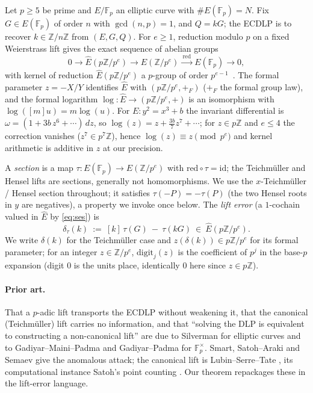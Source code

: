 \documentclass[11pt]{article}
\theoremstyle{definition}
\newcommand{\Fp}{\mathbb{F}_p}
\newcommand{\Z}{\mathbb{Z}}
\newcommand{\Ehat}{\widehat{E}}
\newcommand{\red}{\mathrm{red}}
\begin{document}
Let $p\ge 5$ be prime and $E/\Fp$ an elliptic curve with $\#E(\Fp)=N$.
Fix $G\in E(\Fp)$ of order $n$ with $\gcd(n,p)=1$, and $Q=kG$; the ECDLP
is to recover $k\in\Z/n\Z$ from $(E,G,Q)$. For $e\ge 1$, reduction modulo
$p$ on a fixed Weierstrass lift gives the exact sequence of abelian
groups
\begin{equation}\label{eq:ses}
0 \longrightarrow \Ehat(p\Z/p^e) \longrightarrow E(\Z/p^e)
  \xrightarrow{\ \red\ } E(\Fp) \longrightarrow 0,
\end{equation}
with kernel of reduction $\Ehat(p\Z/p^e)$ a $p$-group of order $p^{e-1}$~\cite{silvermanaec}.
The formal parameter $z=-X/Y$ identifies $\Ehat$ with $(p\Z/p^e,+_F)$
($+_F$ the formal group law), and the formal logarithm
$\log\colon\Ehat\to(p\Z/p^e,+)$ is an isomorphism with
$\log([m]u)=m\log(u)$. For $E\colon y^2=x^3+b$ the invariant differential
is $\omega=(1+3b\,z^6+\cdots)\,dz$, so
$\log(z)=z+\tfrac{3b}{7}z^7+\cdots$; for $z\in p\Z$ and $e\le 4$ the
correction vanishes ($z^7\in p^7\Z$), hence $\log(z)\equiv z\pmod{p^e}$
and kernel arithmetic is additive in $z$ at our precision.

A \emph{section} is a map $\tau\colon E(\Fp)\to E(\Z/p^e)$ with
$\red\circ\tau=\mathrm{id}$; the Teichm\"uller and Hensel lifts are
sections, generally not homomorphisms. We use the $x$-Teichm\"uller /
Hensel section throughout; it satisfies $\tau(-P)=-\tau(P)$ (the two
Hensel roots in $y$ are negatives), a property we invoke once below. The
\emph{lift error} (a $1$-cochain valued in $\Ehat$ by \eqref{eq:ses}) is
\begin{equation}
\delta_\tau(k)\ :=\ [k]\,\tau(G)\ -\ \tau(kG)\ \in\ \Ehat(p\Z/p^e).
\end{equation}
We write $\delta(k)$ for the Teichm\"uller case and
$z(\delta(k))\in p\Z/p^e$ for its formal parameter; for an integer
$z\in\Z/p^e$, $\mathrm{digit}_j(z)$ is the coefficient of $p^j$ in the
base-$p$ expansion (digit $0$ is the units place, identically $0$ here
since $z\in p\Z$).

\paragraph{Prior art.} That a $p$-adic lift transports the ECDLP without
weakening it, that the canonical (Teichm\"uller) lift carries no
information, and that ``solving the DLP is equivalent to constructing a
non-canonical lift'' are due to Silverman \cite{silvermanlift,
silverman4faces} for elliptic curves and to Gadiyar--Maini--Padma and
Gadiyar--Padma \cite{gadiyarpadma} for $\Fp^\times$. Smart, Satoh--Araki
and Semaev \cite{smart,satoharaki,semaev} give the anomalous attack; the
canonical lift is Lubin--Serre--Tate \cite{lst}, its computational
instance Satoh's point counting \cite{satohcount}. Our theorem repackages
these in the lift-error language.
\end{document}
